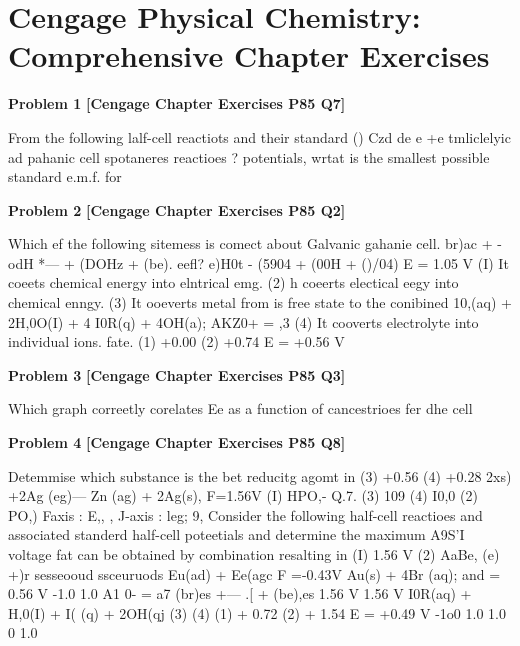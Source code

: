 \chapter{Cengage Physical Chemistry: Comprehensive Chapter Exercises}
\label{chap:cng_theory_all_questions}

\begin{problembox}
\textbf{Problem 1} \hfill \textbf{[Cengage Chapter Exercises P85 Q7]}
\label{q:ext-cng-th-1}

From the following lalf-cell reactiots and their standard
() Czd de e +e tmliclelyic ad
pahanic cell
spotaneres reactioes ?
potentials, wrtat is the smallest possible standard e.m.f. for
\end{problembox}

\begin{problembox}
\textbf{Problem 2} \hfill \textbf{[Cengage Chapter Exercises P85 Q2]}
\label{q:ext-cng-th-2}

Which ef the following sitemess is comect about Galvanic
gahanie cell.
br)ac + -odH *---  + (DOHz + (be). 
eefl?
e)H0t - (5904    + (00H + ()/04)
E  = 1.05 V
(I) It coeets chemical energy into elntrical emg.
(2) h coeerts electical eegy into chemical enngy.
(3) It ooeverts metal from is free state to the conibined
10,(aq) + 2H,0O(I) + 4   I0R(q) + 4OH(a);
AKZ0+ = ,3
(4) It cooverts electrolyte into individual ions.
fate.
(1) +0.00
(2) +0.74
E  = +0.56 V
\end{problembox}

\begin{problembox}
\textbf{Problem 3} \hfill \textbf{[Cengage Chapter Exercises P85 Q3]}
\label{q:ext-cng-th-3}

Which graph correetly corelates Ee as a function of
cancestrioes fer dhe cell
\end{problembox}

\begin{problembox}
\textbf{Problem 4} \hfill \textbf{[Cengage Chapter Exercises P85 Q8]}
\label{q:ext-cng-th-4}

Detemmise which substance is the bet reducitg agomt in
(3) +0.56
(4) +0.28
2xs) +2Ag  (eg)---  Zn (ag) + 2Ag(s),
F=1.56V
(I) HPO,-
Q.7.
(3) 109
(4) I0,0
(2) PO,)
Faxis : E,,
, J-axis : leg;
9, Consider the following half-cell reactioes and associated
standerd half-cell poteetials and determine the maximum
A9S'I
voltage fat can be obtained by combination resalting in
(I)
1.56 V
(2)
AaBe, (e) +)r 
sesseooud ssceuruods
Eu(ad) + 
  Ee(agc F  =-0.43V
  Au(s) + 4Br (aq);  and   = 0.56 V
-1.0
1.0
A1 0- = a7 (br)es +--- .[ + (be),es
1.56 V
1.56 V
I0R(aq) + H,0(I) +    I( (q) + 2OH(qj
(3)
(4)
(1) + 0.72
(2) + 1.54
E  = +0.49 V
-1o0
1.0
1.0
0
1.0
\end{problembox}


